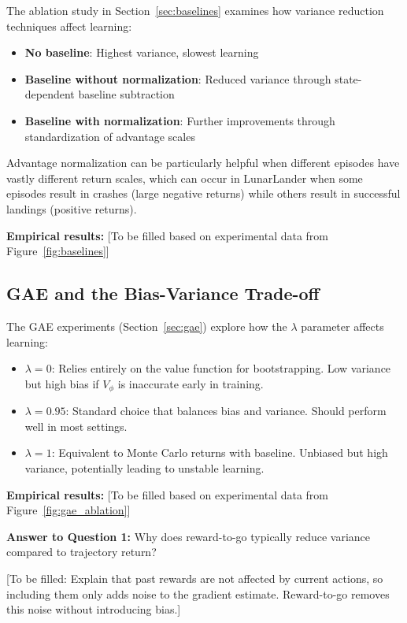\documentclass[11pt, a4paper, oneside]{memoir}
\begin{document}
The ablation study in Section~\ref{sec:baselines} examines how variance reduction techniques affect learning:

\begin{itemize}
\item \textbf{No baseline}: Highest variance, slowest learning
\item \textbf{Baseline without normalization}: Reduced variance through state-dependent baseline subtraction
\item \textbf{Baseline with normalization}: Further improvements through standardization of advantage scales
\end{itemize}

Advantage normalization can be particularly helpful when different episodes have vastly different return scales, which can occur in LunarLander when some episodes result in crashes (large negative returns) while others result in successful landings (positive returns).

\textbf{Empirical results:} [To be filled based on experimental data from Figure~\ref{fig:baselines}]

\subsection{GAE and the Bias-Variance Trade-off}

The GAE experiments (Section~\ref{sec:gae}) explore how the $\lambda$ parameter affects learning:

\begin{itemize}
\item $\lambda = 0$: Relies entirely on the value function for bootstrapping. Low variance but high bias if $V_\phi$ is inaccurate early in training.
\item $\lambda = 0.95$: Standard choice that balances bias and variance. Should perform well in most settings.
\item $\lambda = 1$: Equivalent to Monte Carlo returns with baseline. Unbiased but high variance, potentially leading to unstable learning.
\end{itemize}

\textbf{Empirical results:} [To be filled based on experimental data from Figure~\ref{fig:gae_ablation}]

\textbf{Answer to Question 1:} Why does reward-to-go typically reduce variance compared to trajectory return?

[To be filled: Explain that past rewards are not affected by current actions, so including them only adds noise to the gradient estimate. Reward-to-go removes this noise without introducing bias.]
\end{document}
